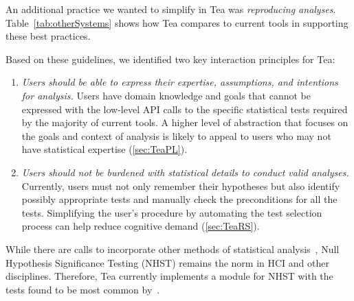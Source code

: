 An additional practice we wanted to simplify in Tea was \textit{reproducing analyses}. Table~\ref{tab:otherSystems} shows how Tea compares to current tools in supporting these best practices.


Based on these guidelines, we identified two key interaction principles for Tea: 
\begin{enumerate}
    \item \textit{Users should be able to express their expertise, assumptions,
    and intentions for analysis.} Users have domain knowledge and goals
    that cannot be expressed with the low-level API calls to the specific
    statistical tests required by the majority of current tools. A higher level
    of abstraction that focuses on the goals and context of analysis is
    likely to appeal to users who may not have statistical expertise (\autoref{sec:TeaPL}).
    \item \textit{Users should not be burdened with statistical details to
    conduct valid analyses.} Currently, users must not only remember their hypotheses but
    also identify possibly appropriate tests and manually check the
    preconditions for all the tests. %
    Simplifying the user's procedure by automating the test selection process
    can help reduce cognitive demand (\autoref{sec:TeaRS}).
\end{enumerate}

While there are calls to incorporate other methods of statistical
analysis~\cite{kay2016researcher,kaptein2012rethinking}, Null
Hypothesis Significance Testing (NHST) remains the norm in HCI and
other disciplines. Therefore, Tea currently implements a module for
NHST with the tests found to be most common
by~\cite{wacharamanotham2015statsplorer}. %